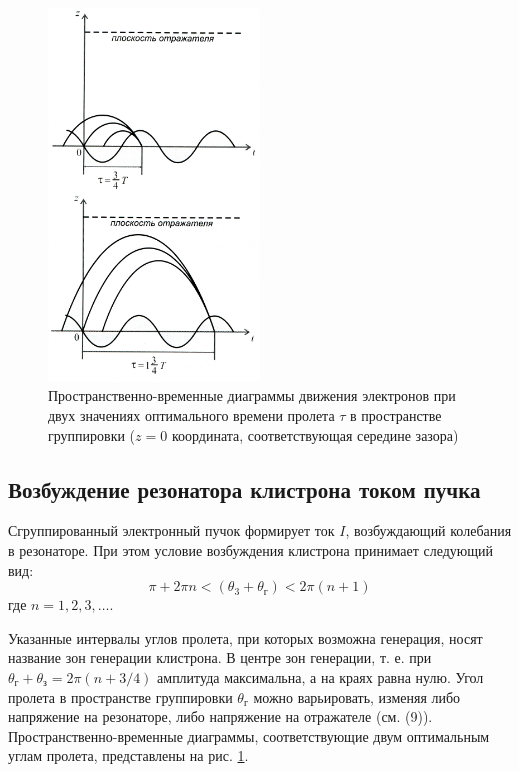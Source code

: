 \documentclass[a4paper,14pt]{extarticle}
\begin{document}
\begin{figure}[H]
  \centering
  \includegraphics[width=0.5\textwidth]{fig/fig3}
  \caption{Пространственно-временные диаграммы движения электронов при двух значениях оптимального времени пролета $\tau$ в пространстве группировки ($z=0$ координата, соответствующая середине зазора)}
  \label{fig:3}
\end{figure}

\subsection{Возбуждение резонатора клистрона током пучка}
Сгруппированный электронный пучок формирует ток $I$, возбуждающий колебания в резонаторе. При этом условие возбуждения клистрона принимает следующий вид:
\begin{equation}
  \pi + 2 \pi n < \left( \theta _ { 3 } + \theta _ { \text{г} } \right) < 2 \pi ( n + 1 )
\end{equation}где $n=1,2,3,\dots $.

Указанные интервалы углов пролета, при которых возможна генерация, носят название зон генерации клистрона. В центре зон генерации, т. е. при
$\theta _ { \text{г} } + \theta _ { \text{з} } = 2 \pi ( n + 3 / 4 )$ амплитуда максимальна, а на краях равна нулю. Угол пролета в пространстве группировки $\theta _ { \text{г} }$ можно варьировать, изменяя ли­бо напряжение на резонаторе, либо напряжение на отражателе (см. (9)).
Пространственно-временные диаграммы, соответствующие двум оптималь­ным углам пролета, представлены на рис. \ref{fig:3}.
\end{document}
